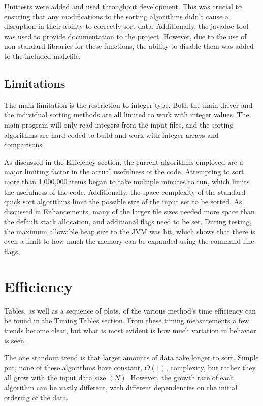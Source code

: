 \documentclass[a4paper,12pt]{article}
\begin{document}
Unittests were added and used throughout development.  This was crucial to ensuring that any modifications to the sorting algorithms didn't cause a disruption in their ability to correctly sort data.  Additionally, the javadoc tool was used to provide documentation to the project.  However, due to the use of non-standard libraries for these functions, the ability to disable them was added to the included makefile.


\subsection{Limitations}
The main limitation is the restriction to integer type.  Both the main driver and the individual sorting methods are all limited to work with integer values.  The main program will only read integers from the input files, and the sorting algorithms are hard-coded to build and work with integer arrays and comparisons.  

As discussed in the Efficiency section, the current algorithms employed are a major limiting factor in the actual usefulness of the code.  Attempting to sort more than 1,000,000 items began to take multiple minutes to run, which limits the usefulness of the code.  Additionally, the space complexity of the standard quick sort algorithms limit the possible size of the input set to be sorted.  As discussed in Enhancements, many of the larger file sizes needed more space than the default stack allocation, and additional flags need to be set.  During testing, the maximum allowable heap size to the JVM was hit, which shows that there is even a limit to how much the memory can be expanded using the command-line flags.


\section{Efficiency}

Tables, as well as a sequence of plots, of the various method's time efficiency can be found in the Timing Tables section.  From these timing measurements a few trends become clear, but what is most evident is how much variation in behavior is seen.

The one standout trend is that larger amounts of data take longer to sort.  Simple put, none of these algorithms have constant, $O(1)$, complexity, but rather they all grow with the input data size $(N)$.  However, the growth rate of each algorithm can be vastly different, with different dependencies on the initial ordering of the data.
 
\end{document}
